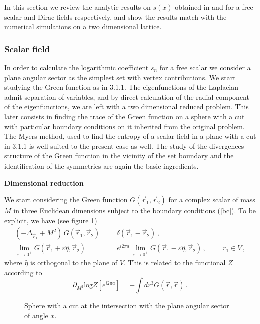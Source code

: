 \documentclass[a4paper]{article}
\begin{document}
In this section we review the analytic results on $s(x)$ obtained in \cite{log} and \cite{log1} for a free scalar and Dirac fields respectively, and show the results match with the numerical simulations on a two dimensional lattice. 


\subsubsection{Scalar field}

In order to calculate the logarithmic coefficient $s_n$ for a free scalar we consider a plane angular sector as the simplest set with vertex contributions. We start studying the Green function as in 3.1.1.  The eigenfunctions of the Laplacian admit separation of variables, and by direct calculation of the radial component of the eigenfunctions, we are left with a two dimensional reduced problem. This later consists in finding the trace of the Green function on a sphere with a cut with particular boundary conditions on it inherited from the original problem. The Myers method, used to find the entropy of a scalar field in a plane with a cut in 3.1.1 is well suited to the present case as well. The study of the divergences structure of the Green function in the vicinity of the set boundary and the identification of the symmetries are again the basic ingredients. 
\smallskip

\noindent
\textbf{Dimensional reduction}

\noindent
We start considering the Green function $G(\vec{r}_1,\vec{r}_2)$ for a complex scalar of mass $M$ in three Euclidean dimensions subject to the boundary conditions (\ref{bc}). To be explicit, we have (see figure \ref{esfe})
\begin{eqnarray}
(-\Delta_{\vec{r}_1}+M^2) \,G(\vec{r}_1,\vec{r}_2)&=&\delta(\vec{r}_1-\vec{r}_2)\,,\\
\lim_{\varepsilon\rightarrow 0^+} G(\vec{r}_1+\varepsilon \hat{\eta},\vec{r}_2)&=&e^{i 2 \pi a}  \,\lim_{\varepsilon\rightarrow 0^+} G(\vec{r}_1-\varepsilon \hat{\eta},\vec{r}_2)\,, \hspace{1cm} r_1\in V\, ,\label{catorr}
\end{eqnarray} 
 where  $\hat{\eta}$ is orthogonal to the plane of $V$. This is related to the functional $Z$ according to 
\begin{equation}
\partial_{M^2}\textrm{log}Z[e^{i 2\pi a}]=-\int dr^3 G(\vec{r},\vec{r})\,.
\label{green}
\end{equation}

 \begin{figure} [tbp]
\centering
\leavevmode
\epsfxsize=6cm
\bigskip
{}
\caption{Sphere with a cut at the intersection with the plane angular sector of angle $x$.}
\label{esfe}
\end{figure}
\end{document}
